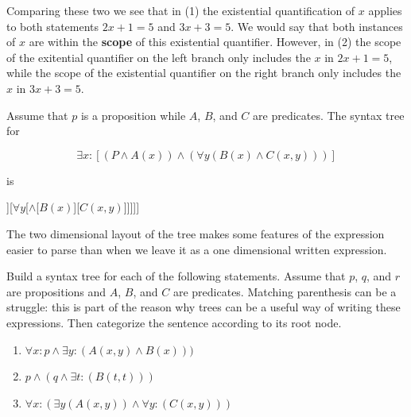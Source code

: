 Comparing these two we see that in (1) the existential quantification of $x$ applies to both statements $2x+1 = 5$ and $3x+3  = 5$.  We would say that both instances of $x$ are within the \textbf{scope} of this existential quantifier.  However, in (2) the scope of the exitential quantifier on the left branch only includes the $x$ in $2x+1  = 5$, while the scope of the existential quantifier on the right branch only includes the $x$ in $3x+3 = 5$.

\begin{example}
	Assume that $p$ is a proposition while $A$, $B$, and $C$ are predicates. The syntax tree for 
	
	\[
	\exists x :[( P \wedge A(x)) \wedge ( \forall y( B(x) \wedge C(x,y) ))]
	\]
	
	is
	
	\begin{center}
		\begin{forest}
			[\(\exists x\)[\(\wedge\)[\(\wedge\)[\(P\)][\(A(x)\)]][\(\forall y \)[\(\wedge\)[\(B(x)\)][\({C(x,y)}\)]]]]]
		\end{forest}
	\end{center}
	
	The two dimensional layout of the tree makes some features of the expression easier to parse than when we leave it as a one dimensional written expression.
\end{example}

\begin{xca}
	Build a syntax tree for each of the following statements.  Assume that $p$, $q$, and $r$ are propositions and $A$, $B$, and $C$ are predicates.  Matching parenthesis can be a struggle:  this is part of the reason why trees can be a useful way of writing these expressions.  Then categorize the sentence according to its root node.
	
	\begin{enumerate}
		\item $\forall x:  p \wedge \exists y :(A(x,y) \wedge B(x)))$
		\item $p \wedge (q \wedge \exists t: (B(t,t)) )$
		\item $\forall x: ( \exists y (A(x,y)) \wedge \forall y: (C(x,y)))$
	\end{enumerate}
\end{xca}


